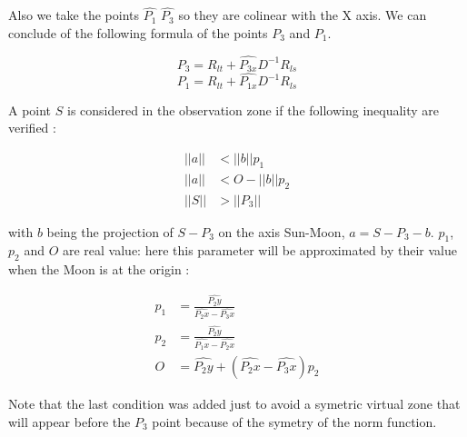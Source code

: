 \documentclass[11pt]{article} %
\begin{document}
		Also we take the points $\hat{P_1}$ $\hat{P_3}$ so they are colinear with the X axis. We can conclude of the following formula of the points $P_3$ and $P_1$.
		
		
		$$
		\begin{equation}
			P_3=R_{lt}+\hat{P_{3x}}D^{-1}R_{ls} 
		\end{equation}
		$$
		$$
		\begin{equation}
			P_1=R_{lt}+\hat{P_{1x}}D^{-1}R_{ls} 
		\end{equation}
		$$
		
		A point $S$ is considered in the observation zone if the following inequality are verified : 
		
		$$
		\begin{equation}
			\begin{align}
				||a||&<||b||p_1\\
				||a||&<O-||b||p_2\\
				||S||&>||P_3||
			\end{align}	
		\end{equation}
		$$
		
		
		with $b$ being the projection of $S-P_3$ on the axis Sun-Moon, $a=S-P_3-b$. $p_1$, $p_2$ and $O$ are real value: here this parameter will be approximated by their value when the Moon is at the origin :
		
		
		$$
		\begin{align}
			p_1&=\frac{\hat{P_2y}}{\hat{P_2x}-\hat{P_3x}}\\
			p_2&=\frac{\hat{P_2y}}{\hat{P_1x}-\hat{P_2x}}\\
			O&=\hat{P_2y}+(\hat{P_2x}-\hat{P_3x})p_2
		\end{align}	
		$$ 
		
		Note that the last condition was added just to avoid a symetric virtual zone that will appear before the $P_3$ point because of the symetry of the norm function.
		
\end{document}
